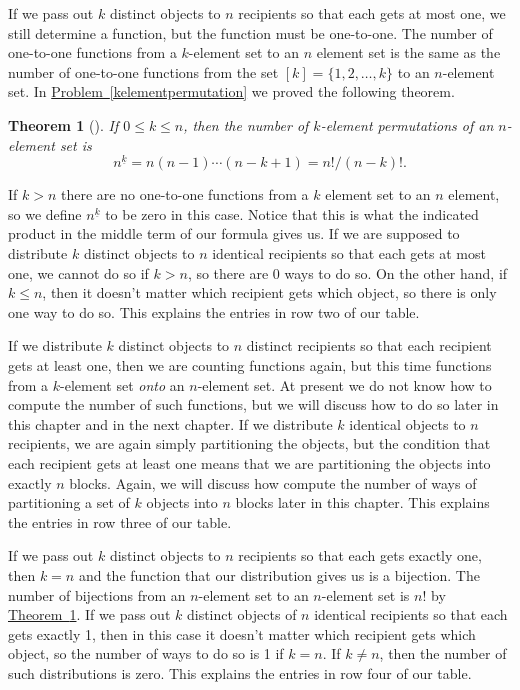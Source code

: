 \documentclass[10pt,]{book}
\theoremstyle{plain}
\newtheorem{theorem}{Theorem}[section]
\theoremstyle{definition}
\numberwithin{equation}{chapter}
\begin{document}
\par
If we pass out \(k\) distinct objects to \(n\) recipients so that each gets at most one, we still determine a function, but the function must be one-to-one. The number of one-to-one functions from a \(k\)-element set to an \(n\) element set is the same as the number of one-to-one functions from the set \([k] =\{1,2,\ldots,k\}\) to an \(n\)-element set. In \hyperref[kelementpermutation]{Problem~\ref{kelementpermutation}} we proved the following theorem.%
\begin{theorem}[{}]\label{numberofinjections}
If \(0\le k\le n\), then the number of \(k\)-element permutations of an \(n\)-element set is%
\begin{equation*}
n^{\underline{k}} = n(n-1)\cdots(n-k+1) =
n!/(n-k)!.
\end{equation*}
%
\par
{}%
\end{theorem}
If \(k>n\) there are no one-to-one functions from a \(k\) element set to an \(n\) element, so we define \(n^{\underline{k}}\) to be zero in this case. Notice that this is what the indicated product in the middle term of our formula gives us. If we are supposed to distribute \(k\) distinct objects to \(n\) identical recipients so that each gets at most one, we cannot do so if \(k>n\), so there are 0 ways to do so. On the other hand, if \(k\le n\), then it doesn't matter which recipient gets which object, so there is only one way to do so. This explains the entries in row two of our table.%
\par
If we distribute \(k\) distinct objects to \(n\) distinct recipients so that each recipient gets at least one, then we are counting functions again, but this time functions from a \(k\)-element set \emph{onto} an \(n\)-element set. At present we do not know how to compute the number of such functions, but we will discuss how to do so later in this chapter and in the next chapter. If we distribute \(k\) identical objects to \(n\) recipients, we are again simply partitioning the objects, but the condition that each recipient gets at least one means that we are partitioning the objects into exactly \(n\) blocks. Again, we will discuss how compute the number of ways of partitioning a set of \(k\) objects into \(n\) blocks later in this chapter. This explains the entries in row three of our table.%
\par
If we pass out \(k\) distinct objects to \(n\) recipients so that each gets exactly one, then \(k=n\) and the function that our distribution gives us is a bijection. The number of bijections from an \(n\)-element set to an \(n\)-element set is \(n!\) by \hyperref[numberofinjections]{Theorem~\ref{numberofinjections}}. If we pass out \(k\) distinct objects of \(n\) identical recipients so that each gets exactly 1, then in this case it doesn't matter which recipient gets which object, so the number of ways to do so is 1 if \(k=n\). If \(k\not=n\), then the number of such distributions is zero. This explains the entries in row four of our table.%
\end{document}
